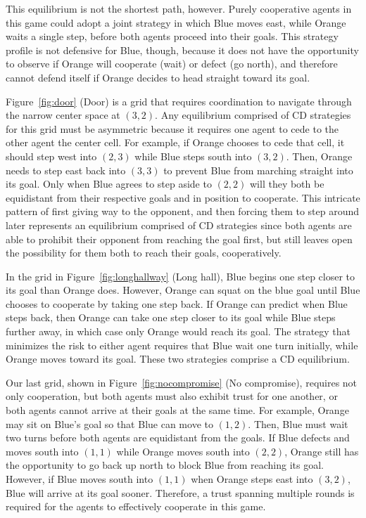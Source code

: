 This equilibrium is not the shortest path, however.
%
Purely cooperative agents in this game could adopt a joint strategy in
which Blue moves east, while Orange waits a single step, before both
agents proceed into their goals.  This strategy profile is not
defensive for Blue, though, because it does not have the opportunity to
observe if Orange will cooperate (wait) or defect (go north), and
therefore cannot defend itself if Orange decides to head straight
toward its goal.


Figure~\ref{fig:door} (Door) is a grid that requires coordination to
navigate through the narrow center space at $(3,2)$. Any
equilibrium comprised of CD strategies for this grid must be asymmetric
because it requires one agent to cede to the other agent the center
cell. For example, if Orange chooses to cede that cell, it should step
west into $(2,3)$ while Blue steps south into $(3,2)$. Then, Orange
needs to step east back into $(3,3)$ to prevent Blue from marching
straight into its goal. Only when Blue agrees to step aside to $(2,2)$
will they both be equidistant from their respective goals and in
position to cooperate.
%
This intricate pattern of first giving way to the opponent, and then
forcing them to step around later represents an equilibrium comprised
of CD strategies since both agents are able to prohibit their
opponent from reaching the goal first, but still leaves open the
possibility for them both to reach their goals, cooperatively.

In the grid in Figure~\ref{fig:longhallway} (Long hall), Blue begins
one step closer to its goal than Orange does.  However, Orange can
squat on the blue goal until Blue chooses to cooperate by taking one
step back. If Orange can predict when Blue steps back, then Orange can
take one step closer to its goal while Blue steps further away, in
which case only Orange would reach its goal.  The strategy that
minimizes the risk to either agent requires that Blue wait one turn
initially, while Orange moves toward its goal.  These two strategies
comprise a CD equilibrium.

Our last grid, shown in Figure~\ref{fig:nocompromise} (No compromise),
requires not only cooperation, but both agents must also exhibit trust
for one another, or both agents cannot arrive at their goals at the
same time.  For example, Orange may sit on Blue's goal so that Blue
can move to $(1,2)$.  Then, Blue must wait two turns before both
agents are equidistant from the goals.  If Blue defects and moves
south into $(1,1)$ while Orange moves south into $(2,2)$, Orange still
has the opportunity to go back up north to block Blue from reaching
its goal.  However, if Blue moves south into $(1,1)$ when Orange steps
east into $(3,2)$, Blue will arrive at its goal sooner.  Therefore, a
trust spanning multiple rounds is required for the agents to
effectively cooperate in this game.

